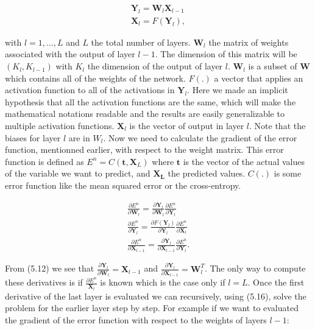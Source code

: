 \documentclass[a4paper,12pt]{article}
\numberwithin{equation}{section}
\begin{document}
\begin{align}\label{eq:12}
\boldsymbol{Y}_l = \boldsymbol{W}_l\boldsymbol{X}_{l-1} \\
\boldsymbol{X}_l = F(\boldsymbol{Y}_l),
\end{align}

\noindent
with $l= 1,\dots,L$ and $L$ the total number of layers. $\boldsymbol{W}_l$ the matrix of weights associated with the output of layer $l-1$. The dimension of this matrix will be $(K_l, K_{l-1})$ with $K_l$ the dimension of the output of layer $l$. $\boldsymbol{W}_l$ is a subset of $\boldsymbol{W}$ which contains all of the weights of the network. $F(.)$ a vector that applies an activation function to all of the activations in $\boldsymbol{Y}_l$. Here we made an implicit hypothesis that all the activation functions are the same, which will make the mathematical notations readable and the results are easily generalizable to multiple activation functions. $\boldsymbol{X}_l$ is the vector of output in layer $l$. Note that the biases for layer $l$ are in $W_l$. Now we need to calculate the gradient of the error function, mentionned earlier, with respect to the weight matrix. This error function is defined as $E^n = C(\boldsymbol{t}, \boldsymbol{X}_{L})$ where $\boldsymbol{t}$ is the vector of the actual values of the variable we want to predict, and $\boldsymbol{X_{L}}$ the predicted values. $C(.)$ is some error function like the mean squared error or the cross-entropy. 

\begin{align}\label{eq:13}
\frac{\partial E^n}{\partial \boldsymbol{W}_l} = \frac{\partial \boldsymbol{Y}_l}{\partial \boldsymbol{W}_l} \frac{\partial E^n}{\partial\boldsymbol{Y}_l} \\
\frac{\partial E^n}{\partial \boldsymbol{Y}_l} = \frac{\partial F(\boldsymbol{Y}_l)}{\partial \boldsymbol{Y}_l} \frac{\partial E^n}{\partial\boldsymbol{X}_l} \\
\frac{\partial E^n}{\partial \boldsymbol{X}_{l-1}} = \frac{\partial \boldsymbol{Y}_l}{\partial \boldsymbol{X}_{l-1}} \frac{\partial E^n}{\partial\boldsymbol{Y}_l}.
\end{align}

From (5.12) we see that $\frac{\partial \boldsymbol{Y}_l}{\partial \boldsymbol{W}_l} = \boldsymbol{X}_{l-1}$ and $\frac{\partial \boldsymbol{Y}_l}{\partial \boldsymbol{X}_{l-1}} = \boldsymbol{W}_l^T$. The only way to compute these derivatives is if $\frac{\partial E^n}{\boldsymbol{X}_l}$ is known which is the case only if $l=L$. Once the first derivative of the last layer is evaluated we can recursively, using (5.16), solve the problem for the earlier layer step by step. For example if we want to evaluated the gradient of the error function with respect to the weights of layers $l-1$: 
\end{document}
